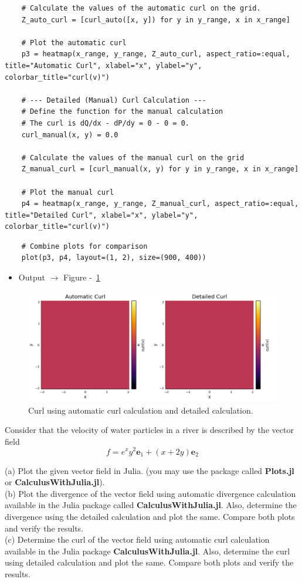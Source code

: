 \documentclass{homework}
\begin{document}
\begin{solution}
\begin{verbatim}
    # Calculate the values of the automatic curl on the grid.
    Z_auto_curl = [curl_auto([x, y]) for y in y_range, x in x_range]

    # Plot the automatic curl
    p3 = heatmap(x_range, y_range, Z_auto_curl, aspect_ratio=:equal,  title="Automatic Curl", xlabel="x", ylabel="y", colorbar_title="curl(v)")
    
    # --- Detailed (Manual) Curl Calculation ---
    # Define the function for the manual calculation
    # The curl is dQ/dx - dP/dy = 0 - 0 = 0.
    curl_manual(x, y) = 0.0   

    # Calculate the values of the manual curl on the grid
    Z_manual_curl = [curl_manual(x, y) for y in y_range, x in x_range]
    
    # Plot the manual curl
    p4 = heatmap(x_range, y_range, Z_manual_curl, aspect_ratio=:equal, title="Detailed Curl", xlabel="x", ylabel="y", colorbar_title="curl(v)")
    \end{verbatim}
    \begin{verbatim}  
    # Combine plots for comparison
    plot(p3, p4, layout=(1, 2), size=(900, 400))
    \end{verbatim}
    
    \begin{itemize}
        \item Output $\rightarrow$ Figure -~\ref{fig:curlcalvsauto}
    \end{itemize}
    
    \begin{figure}[H]
        \centering
        \includegraphics[width=0.5\linewidth]{media/curlcalvsauto.png}
        \caption{Curl using  automatic curl calculation and detailed calculation.}
        \label{fig:curlcalvsauto}
    \end{figure} 
\end{solution}

\question  Consider that the velocity of water particles in a river is described by the vector field
\[
f = e^x y^2 \mathbf{e}_1 + (x + 2y) \mathbf{e}_2
\]

(a) Plot the given vector field in Julia. (you may use the package called \textbf{Plots.jl} or \textbf{CalculusWithJulia.jl}).\\
(b) Plot the divergence of the vector field using automatic divergence calculation available in the Julia package called \textbf{CalculusWithJulia.jl}. Also, determine the divergence using the detailed calculation and plot the same. Compare both plots and verify the results.\\
(c) Determine the curl of the vector field using automatic curl calculation available in the Julia package \textbf{CalculusWithJulia.jl}. Also, determine the curl using detailed calculation and plot the same. Compare both plots and verify the results.
\end{document}
